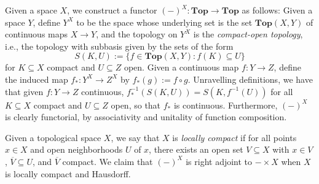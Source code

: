\documentclass{amsart}
\newcommand{\ol}{\overline}
\theoremstyle{plain}
\newtheorem{lemma}[theorem]{Lemma}
\theoremstyle{definition}
\newcommand{\Top}{\mbf{Top}}
\newcommand{\sseq}{\subseteq}
\newcommand{\0}{\mathbf{0}}
\newcommand{\cF}{\mathcal F}
\newcommand{\mbf}[1]{\mathbf{#1}}
\renewcommand{\ol}{\overline}
\renewcommand{\(}{\left(}
\renewcommand{\)}{\right)}
\begin{document}
Given a space $X$, we construct a functor $(-)^X:\Top\to\Top$ as follows: Given a space $Y$, define $Y^X$ to be the space whose underlying set is the set $\Top(X,Y)$ of continuous maps $X\to Y$, and the topology on $Y^X$ is the \textit{compact-open topology}, i.e., the topology with subbasis given by the sets of the form 
\[S(K,U):=\{f\in\Top(X,Y):f(K)\sseq U\}\]
for $K\sseq X$ compact and $U\sseq Z$ open. Given a continuous map $f:Y\to Z$, define the induced map $f_*:Y^X\to Z^X$ by $f_*(g):=f\circ g$. Unravelling definitions, we have that given $f:Y\to Z$ continuous, $f_*^{-1}(S(K,U))=S(K,f^{-1}(U))$ for all $K\sseq X$ compact and $U\sseq Z$ open, so that $f_*$ is continuous. Furthermore, $(-)^X$ is clearly functorial, by associativity and unitality of function composition.

Given a topological space $X$, we say that $X$ is \textit{locally compact} if for all points $x\in X$ and open neighborhoods $U$ of $x$, there exists an open set $V\sseq X$ with $x\in V$, $\ol V\sseq U$, and $\ol V$ compact. We claim that $(-)^X$ is right adjoint to $-\times X$ when $X$ is locally compact and Hausdorff. 

%
\end{document}
